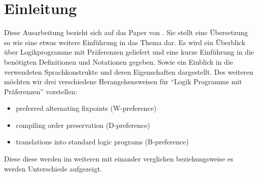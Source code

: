 \section{Einleitung}
Diese Ausarbeitung bezieht sich auf das Paper von \cite{SchaubWang}. Sie stellt eine Übersetzung so wie eine etwas weitere Einführung in das Thema dar. Es wird ein Überblick über Logikprogramme mit Präferenzen geliefert und eine kurze Einführung in die benötigten Definitionen und Notationen gegeben. Sowie ein Einblick in die verwendeten Sprachkonstrukte und deren Eigenschaften dargestellt. Des weiteren möchten wir drei verschiedene Herangehensweisen für ``Logik Programme mit Präferenzen'' vorstellen:
\begin{itemize}
  \item preferred alternating fixpoints (W-preference)
  \item compiling order preservation (D-preference)
  \item translations into standard logic programs (B-preference)
\end{itemize}
Diese diese werden im weiteren mit einander verglichen beziehungsweise es werden Unterschiede aufgezeigt.